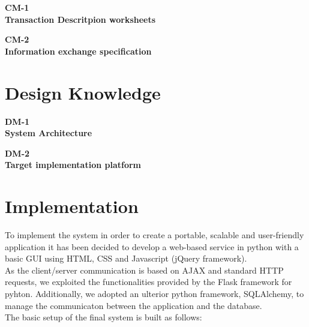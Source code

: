 \documentclass[11pt]{article} %
\def\worksheet#1#2{%
  \begin{center}
  {\large\bf #1} \\
  {\normalsize\bf #2} \\[12pt]
  \begin{footnotesize}
  
  \end{footnotesize}
  \end{center}  
  \vfill}
\begin{document}
\worksheet{CM-1}{Transaction Descritpion worksheets}

\worksheet{CM-2}{Information exchange specification}

\clearpage
\section{Design Knowledge}

\worksheet{DM-1}{System Architecture}

\worksheet{DM-2}{Target implementation platform}

\newpage
\section{Implementation}
To implement the system in order to create a portable, scalable and user-friendly application it has been decided to develop a web-based service in python with a basic GUI using HTML, CSS and Javascript (jQuery framework).\\
\indent As the client/server communication is based on AJAX and standard HTTP requests, we exploited the functionalities provided by the Flask framework for pyhton. Additionally, we adopted an ulterior python framework, SQLAlchemy, to manage the communicaton between the application and the database.\\
\indent The basic setup of the final system is built as follows:
\end{document}
